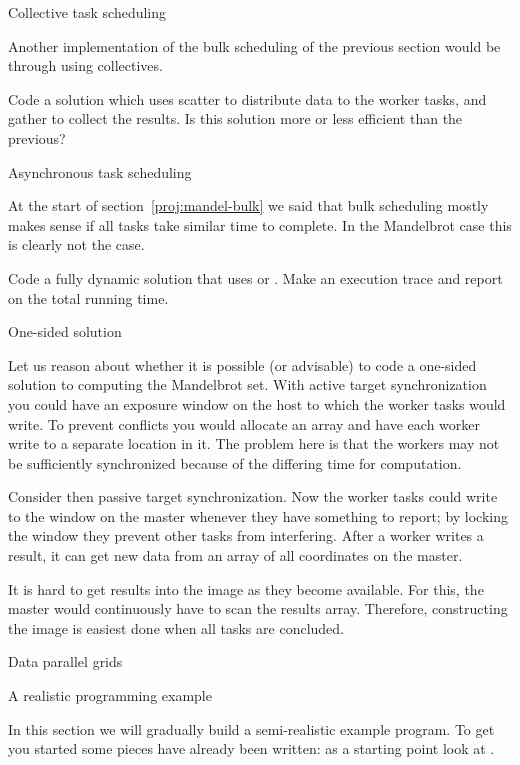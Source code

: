  {Collective task scheduling}
\label{proj:mandel-collective}

Another implementation of the bulk scheduling of the previous section
would be through using collectives.

\begin{exercise}
  Code a solution which uses scatter to distribute data to the worker
  tasks, and gather to collect the results. Is this solution more or
  less efficient than the previous?
\end{exercise}

 {Asynchronous task scheduling}

At the start of section~\ref{proj:mandel-bulk} we said that bulk scheduling
mostly makes sense if all tasks take similar time to complete.
In the Mandelbrot case this is clearly not the case.

\begin{exercise}
  Code a fully dynamic solution that uses  or .
  Make an execution trace and report on the total running time.
\end{exercise}

 {One-sided solution}

Let us reason about whether it is possible (or advisable) to code a
one-sided solution to computing the Mandelbrot set.  
%
With active
target synchronization you could have an exposure window on the host
to which the worker tasks would write. To prevent conflicts you would allocate an 
array and have each worker write to a separate location in it.
%
The problem here is that the workers may not be sufficiently synchronized because
of the differing time for computation.

Consider then passive target synchronization. Now the worker tasks could
write to the window on the master whenever they have something to
report; by locking the window they prevent other tasks from interfering.
%
After a worker writes a result, it can get new data from an array
of all coordinates on the master. 

It is hard to get results into the image as they become available. For
this, the master would continuously have to scan the results
array. Therefore, constructing the image is easiest done when all
tasks are concluded.

 {Data parallel grids}

 {A realistic programming example}

In this section we will gradually build a semi-realistic example
program. To get you started some pieces have already been written:
as a starting point look at .

